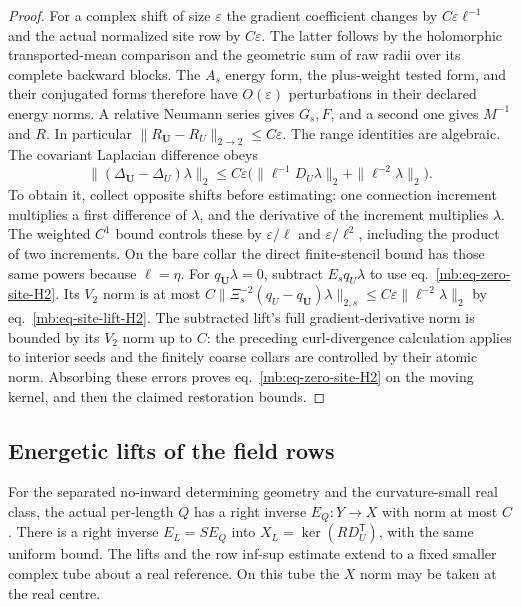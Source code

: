 \documentclass[11pt,letterpaper,reqno]{amsart}
\makeatletter
\numberwithin{equation}{section}
\renewcommand{\eqref}[1]{\textup{eq.~\ref{#1}}}
\theoremstyle{definition}
\newcommand{\ms@minorstart}{%
  \pushQED{\qed}\renewcommand{\qedsymbol}{$\blacksquare$}}
\newenvironment{lemma}[1][]{\ms@minorstart\ms@lemma[#1]}
  {\popQED\endms@lemma}
\theoremstyle{remark}
\makeatother
\begin{document}
\begin{proof}
For a complex shift of size \(\varepsilon\) the gradient
coefficient changes by \(C\varepsilon\ell^{-1}\) and
the actual normalized site row by \(C\varepsilon\).
The latter follows by the holomorphic transported-mean
comparison and the geometric sum of raw radii over its
complete backward blocks. The \(A_s\) energy form,
the plus-weight tested form, and their conjugated forms
therefore have \(O(\varepsilon)\) perturbations in their
declared energy norms. A relative Neumann series gives
\(G_s,F\), and a second one gives \(M^{-1}\) and \(R\).
In particular \(\|R_{\mathbf U}-R_U\|_{2\to2}\le C\varepsilon\).
The range identities are algebraic. The covariant
Laplacian difference obeys
\[
 \|(\Delta_{\mathbf U}-\Delta_U)\lambda\|_2
 \le C\varepsilon\bigl(\|\ell^{-1}D_U\lambda\|_2+
                             \|\ell^{-2}\lambda\|_2\bigr).
\]
To obtain it, collect opposite shifts before estimating:
one connection increment multiplies a first difference
of \(\lambda\), and the derivative of the increment
multiplies \(\lambda\). The weighted \(C^1\) bound controls
these by \(\varepsilon/\ell\) and \(\varepsilon/\ell^2\),
including the product of two increments. On the bare
collar the direct finite-stencil bound has those same
powers because \(\ell=\eta\). For \(q_{\mathbf U}\lambda=0\),
subtract \(E_s q_U\lambda\) to use
\eqref{mb:eq-zero-site-H2}. Its \(V_2\) norm is at most
\(C\|\Xi_s^{-2}(q_U-q_{\mathbf U})\lambda\|_{2,s}
 \le C\varepsilon\|\ell^{-2}\lambda\|_2\)
by \eqref{mb:eq-site-lift-H2}. The subtracted lift's full
gradient-derivative norm is bounded by its \(V_2\) norm
up to \(C\): the preceding curl-divergence calculation
applies to interior seeds and the finitely coarse collars
are controlled by their atomic norm. Absorbing these errors
proves \eqref{mb:eq-zero-site-H2} on the moving kernel,
and then the claimed restoration bounds.
\end{proof}

\subsection{Energetic lifts of the field rows}

\begin{lemma}[A right inverse of the determining field rows]\label{mb:lem-field-lift}
For the separated no-inward determining geometry and the
curvature-small real class, the actual per-length \(Q\) has
a right inverse \(E_Q:Y\to X\) with norm at most \(C\).
There is a right inverse \(E_L=SE_Q\) into
\(X_L=\ker(RD_U^{\mathsf T})\), with the same uniform bound.
The lifts and the row inf-sup estimate extend to a fixed
smaller complex tube about a real reference. On this tube
the \(X\) norm may be taken at the real centre.
\end{lemma}
\end{document}
